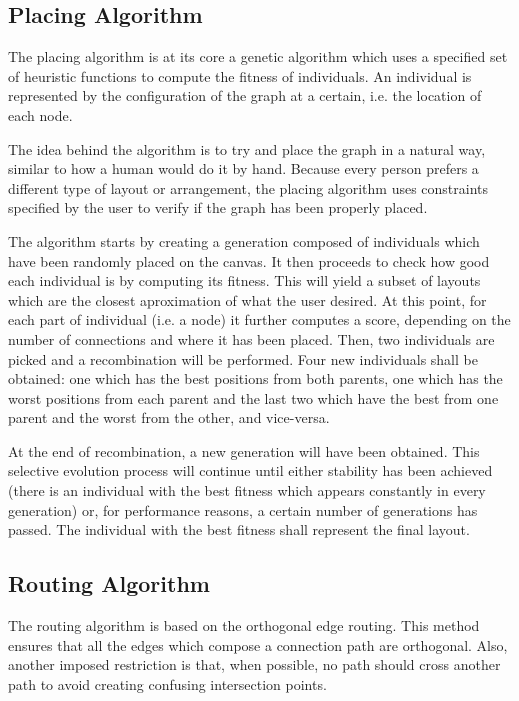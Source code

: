 \label{chap:impl}

\subsection{Placing Algorithm}
 
The placing algorithm is at its core a genetic algorithm \cite{back1997handbook} which uses
a specified set of heuristic functions to compute the fitness of individuals.
An individual is represented by the configuration of the graph at a certain, i.e.
the location of each node.

The idea behind the algorithm is to try and place the graph in a natural way, similar
to how a human would do it by hand. Because every person prefers a different type of 
layout or arrangement, the placing algorithm uses constraints specified by the user
to verify if the graph has been properly placed.

The algorithm starts by creating a generation composed of individuals which have 
been randomly placed on the canvas. It then proceeds to check how good each 
individual is by computing its fitness. This will yield a subset of layouts which
are the closest aproximation of what the user desired. At this point, for each 
part of individual (i.e. a node) it further computes a score, depending on the
number of connections and where it has been placed. Then, two individuals are 
picked and a recombination will be performed. Four new individuals shall be obtained:
one which has the best positions from both parents, one which has the worst positions
from each parent and the last two which have the best from one parent and the 
worst from the other, and vice-versa.

At the end of recombination, a new generation will have been obtained. This selective 
evolution process \cite{back1996evolutionary} will continue until either stability has been achieved (there is an
individual with the best fitness which appears constantly in every generation) or, for 
performance reasons, a certain number of generations has passed. The individual with 
the best fitness shall represent the final layout.

\subsection{Routing Algorithm}

The routing algorithm is based on the orthogonal edge routing. This method ensures 
that all the edges which compose a connection path are orthogonal. Also, another 
imposed restriction is that, when possible, no path should cross another path to 
avoid creating confusing intersection points.

